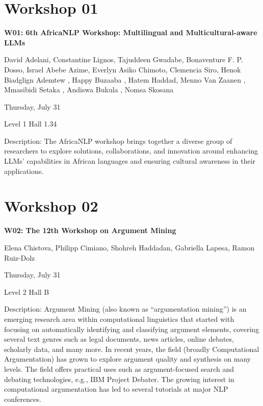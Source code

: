 \clearpage



\section[W01: 6th AfricaNLP Workshop: Multilingual and Multicultural-aware LLMs]{Workshop 01}

\begin{center}
    {\Large \textbf{W01: 6th AfricaNLP Workshop: Multilingual and Multicultural-aware LLMs}}

    David Adelani, Constantine Lignos, Tajuddeen Gwadabe, Bonaventure F. P. Dosso, Israel Abebe Azime, Everlyn Asiko Chimoto, Clemencia Siro, Henok Biadglign Ademtew , Happy Buzaaba , Hatem Haddad, Menno Van Zaanen , Mmasibidi Setaka , Andiswa Bukula , Nomsa Skosana

    Thursday, July 31
    
    Level 1 Hall 1.34

\end{center}

Description: The AfricaNLP workshop brings together a diverse group of researchers to explore solutions, collaborations, and innovation around enhancing LLMs’ capabilities in African languages and ensuring cultural awareness in their applications. 

\clearpage



\section[W02: The 12th Workshop on Argument Mining]{Workshop 02}

\begin{center}
    {\Large \textbf{W02: The 12th Workshop on Argument Mining}}

    Elena Chistova, Philipp Cimiano, Shohreh Haddadan, Gabriella Lapesa, Ramon Ruiz-Dolz                                                                                                                                                                                                

    Thursday, July 31
    
    Level 2 Hall B

\end{center}
	
Description: Argument Mining (also known as “argumentation mining”) is an emerging research area within computational linguistics that started with focusing on automatically identifying and classifying argument elements, covering several text genres such as legal documents, news articles, online debates, scholarly data, and many more. In recent years, the field (broadly Computational Argumentation) has grown to explore argument quality and synthesis on many levels. The field offers practical uses such as argument-focused search and debating technologies, e.g., IBM Project Debater. The growing interest in computational argumentation has led to several tutorials at major NLP conferences.

